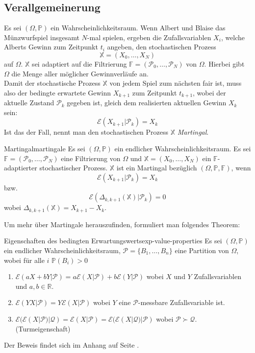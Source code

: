 \documentclass[11pt]{report} %
\begin{document}
\subsection{Verallgemeinerung}
Es sei $(\Omega, \mathbb{P})$ ein Wahrscheinlichkeitsraum. Wenn Albert und Blaise das Münzwurfspiel insgesamt $N$-mal spielen, ergeben die Zufallsvariablen $X_i$, welche Alberts Gewinn zum Zeitpunkt $t_i$ angeben, den stochastischen Prozess $$\mathbb{X}=(X_0, \ldots, X_N)$$ auf $\Omega$. $\mathbb{X}$ sei adaptiert auf die Filtrierung $\mathbb{F}=(\mathcal{P}_0, \ldots, \mathcal{P}_N)$ von $\Omega$. Hierbei gibt $\Omega$ die Menge aller möglicher Gewinnverläufe an.
\\Damit der stochastische Prozess $\mathbb{X}$ von jedem Spiel zum nächsten fair ist, muss also der bedingte erwartete Gewinn $X_{k+1}$ zum Zeitpunkt $t_{k+1}$, wobei der aktuelle Zustand $\mathcal{P}_k$ gegeben ist, gleich dem realisierten aktuellen Gewinn $X_k$ sein: $$\mathcal{E}(X_{k+1}|\mathcal{P}_k)=X_k$$ Ist das der Fall, nennt man den stochastischen Prozess $\mathbb{X}$ \textit{Martingal}.
\begin{Definition}{Martingal}{martingale}
    Es sei $(\Omega, \mathbb{P})$ ein endlicher Wahrscheinlichkeitsraum. Es sei $\mathbb{F}=(\mathcal{P}_0, \ldots, \mathcal{P}_N)$ eine Filtrierung von $\Omega$ und $\mathbb{X}=(X_0, \ldots, X_N)$ ein $\mathbb{F}$-adaptierter stochastischer Prozess. $\mathbb{X}$ ist ein Martingal bezüglich $(\Omega, \mathbb{P}, \mathbb{F})$, wenn
    $$\mathcal{E}(X_{k+1}|\mathcal{P}_k)=X_k$$ bzw. $$\mathcal{E}(\Delta_{k, k+1}(\mathbb{X})|\mathcal{P}_k)=0$$ wobei $\Delta_{k, k+1}(\mathbb{X})=X_{k+1}-X_{k}$.
\end{Definition}
Um mehr über Martingale herauszufinden, formuliert man folgendes Theorem:
\begin{Theorem}{Eigenschaften des bedingten Erwartungswerts}{exp-value-properties}
    Es sei $(\Omega, \mathbb{P})$ ein endlicher Wahrscheinlichkeitsraum, $\mathcal{P}=\{ B_1, \ldots, B_n\}$ eine Partition von $\Omega$, wobei für alle $i$ $\mathbb{P}(B_i)>0$
    \begin{enumerate}
        \item $\mathcal{E}(aX+bY|\mathcal{P})=a\mathcal{E}(X|\mathcal{P})+b\mathcal{E}(Y|\mathcal{P})$ wobei $X$ und $Y$ Zufallsvariablen und $a, b \in \mathbb{R}$.
        \item $\mathcal{E}(YX|\mathcal{P})=Y\mathcal{E}(X|\mathcal{P})$ wobei $Y$ eine $\mathcal{P}$-messbare Zufallsvariable ist.
        \item $\mathcal{E}(\mathcal{E}(X|\mathcal{P})|\mathcal{Q})=\mathcal{E}(X|\mathcal{P})=\mathcal{E}(\mathcal{E}(X|\mathcal{Q})|\mathcal{P})$ wobei $\mathcal{P}\succ\mathcal{Q}$. (Turmeigenschaft)
    \end{enumerate}
    Der Beweis findet sich im Anhang auf Seite \pageref{proof:towerprop}.
\end{Theorem}
\end{document}
